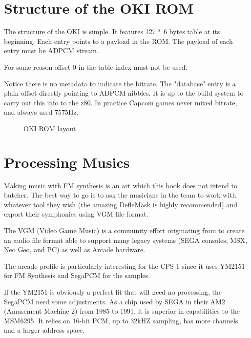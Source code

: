 
\section{Structure of the OKI ROM}
The structure of the OKI is simple. It features 127 * 6 bytes table at its beginning. Each entry points to a payload in the ROM. The payload of each entry must be ADPCM stream.

For some reason offset 0 in the table index must not be used.



Notice there is no metadata to indicate the bitrate. The "database" entry is a plain offset directly pointing to ADPCM nibbles. It is up to the build system to carry out this info to the z80. In practice Capcom games never mixed bitrate, and always used 7575Hz.

\begin{figure}[H]
\caption*{OKI ROM layout\cite{MSM6295_datasheet}}
\end{figure}















\section{Processing Musics}
Making music with FM synthesis is an art which this book does not intend to butcher. The best way to go is to ask the musicians in the team to work with whatever tool they wish (the amazing DefleMask is highly recommended) and export their symphonies using VGM file format.

The VGM (Video Game Music) is a community effort originating from  to create an audio file format able to support many legacy systems (SEGA consoles, MSX, Neo Geo, and PC) as well as Arcade hardware.

The arcade profile is particularly interesting for the CPS-1 since it uses YM2151 for FM Synthesis and SegaPCM for the samples.

If the YM2151 is obviously a perfect fit that will need no processing, the SegaPCM need some adjustments. As a chip used by SEGA in their AM2 (Amusement Machine 2) from 1985 to 1991, it is superior in capabilities to the MSM6295. It relies on 16-bit PCM, up to 32kHZ sampling, has more channels. and a larger address space.

